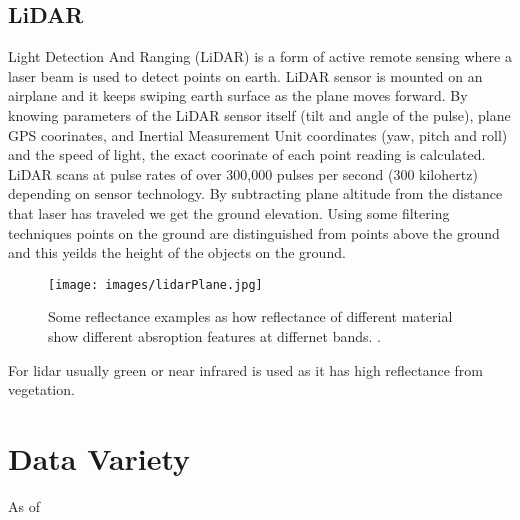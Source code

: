 \subsection{LiDAR}

Light Detection And Ranging (LiDAR) is a form of active remote sensing where a laser beam is used to detect points on earth. LiDAR sensor is mounted on an airplane and it keeps swiping earth surface as the plane moves forward. By knowing parameters of the LiDAR sensor itself (tilt and angle of the pulse), plane GPS coorinates, and Inertial Measurement Unit coordinates (yaw, pitch and roll) and the speed of light, the exact coorinate of each point reading is calculated. LiDAR scans at pulse rates of over 300,000 pulses per second (300 kilohertz) depending on sensor technology. By subtracting plane altitude from the distance that laser has traveled we get the ground elevation.  Using some filtering techniques points on the ground are distinguished from points above the ground and this yeilds the height of the objects on the ground.

\begin{figure}[t!]
  \centering
    \texttt{[image: images/lidarPlane.jpg]}
    \caption[Some reflectance examples]{Some reflectance examples as how reflectance of different material show different absroption features at differnet bands. \citep{smith2006introduction}.}
    \label{fig:Some reflectance examples}
\end{figure}

For lidar usually green or near infrared is used as it has high reflectance from vegetation.

\section{Data Variety}

As of 


%
%





